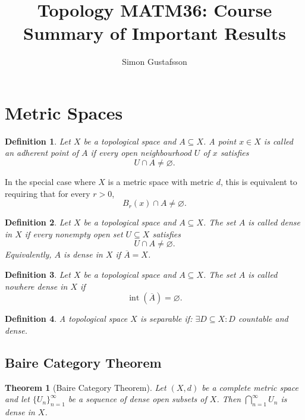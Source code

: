 \documentclass[12pt]{article}
\title{Topology MATM36: Course Summary of Important Results}
\author{Simon Gustafsson}
\date{}
\newtheorem{theorem}{Theorem}
\newtheorem{definition}{Definition}
\begin{document}
\maketitle

\section*{Metric Spaces}

\begin{definition}
Let $X$ be a topological space and $A \subseteq X$. A point $x \in X$ is called an \emph{adherent point} of $A$ if every open neighbourhood $U$ of $x$ satisfies
\[
U \cap A \neq \varnothing.
\]
\end{definition}

In the special case where $X$ is a metric space with metric $d$, this is equivalent to requiring that for every $r>0$,
\[
B_r(x) \cap A \neq \varnothing.
\]

\begin{definition}
Let $X$ be a topological space and $A \subseteq X$. The set $A$ is called \emph{dense} in $X$ if every nonempty open set $U \subseteq X$ satisfies
\[
U \cap A \neq \varnothing.
\]
Equivalently, $A$ is dense in $X$ if $\overline{A} = X$.
\end{definition}

\begin{definition}
Let $X$ be a topological space and $A \subseteq X$. 
The set $A$ is called \emph{nowhere dense} in $X$ if
\[
\operatorname{int}(\overline{A}) = \varnothing.
\]
\end{definition}

\begin{definition}
A topological space $X$ is \emph{separable} if: $\exists D \subseteq X : D$ countable and dense.
\end{definition}

\subsection*{Baire Category Theorem}

\begin{theorem}[Baire Category Theorem]
Let $(X,d)$ be a complete metric space and let $\{U_n\}_{n=1}^{\infty}$ be a sequence of dense open subsets of $X$. Then \(\bigcap_{n=1}^{\infty} U_n\) is dense in $X$.
\end{theorem}
\end{document}
